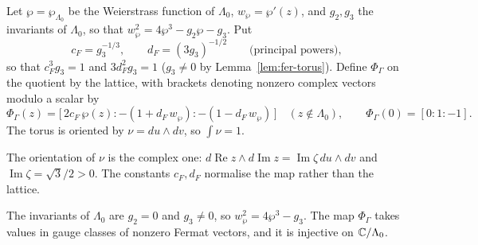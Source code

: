\begin{definition}\label{def:fer-torus}
Let $\wp=\wp_{\Lambda_0}$ be the Weierstrass function of $\Lambda_0$, $w_\wp=\wp'(z)$, and $g_2,g_3$ the invariants of
$\Lambda_0$, so that $w_\wp^2=4\wp^3-g_2\wp-g_3$. Put
\[
 c_F=g_3^{-1/3},\qquad d_F=(3g_3)^{-1/2}\qquad\text{(principal powers)},
\]
so that $c_F^3g_3=1$ and $3d_F^2g_3=1$ ($g_3\ne0$ by Lemma~\ref{lem:fer-torus}). Define $\Phi_\Gamma$ on the quotient by the lattice, with brackets denoting nonzero complex vectors modulo a scalar by
\[
 \Phi_\Gamma(z)=\big[\,2c_F\,\wp(z):-(1+d_F\,w_\wp):-(1-d_F\,w_\wp)\,\big]\quad(z\notin\Lambda_0),\qquad
 \Phi_\Gamma(0)=[0:1:-1].
\]
The torus is oriented by $\nu=du\wedge dv$, so $\int\nu=1$.
\end{definition}

The orientation of $\nu$ is the complex one: $d\operatorname{Re}z\wedge d\operatorname{Im}z=\operatorname{Im}\zeta\,du\wedge dv$ and
$\operatorname{Im}\zeta=\sqrt3/2>0$. The constants $c_F,d_F$ normalise the map rather than the lattice.

\begin{lemma}\label{lem:fer-torus}
The invariants of $\Lambda_0$ are $g_2=0$ and $g_3\ne0$, so $w_\wp^2=4\wp^3-g_3$. The map $\Phi_\Gamma$ takes values in gauge classes of nonzero Fermat vectors, and it is injective on $\mathbb{C}/\Lambda_0$.
\end{lemma}

